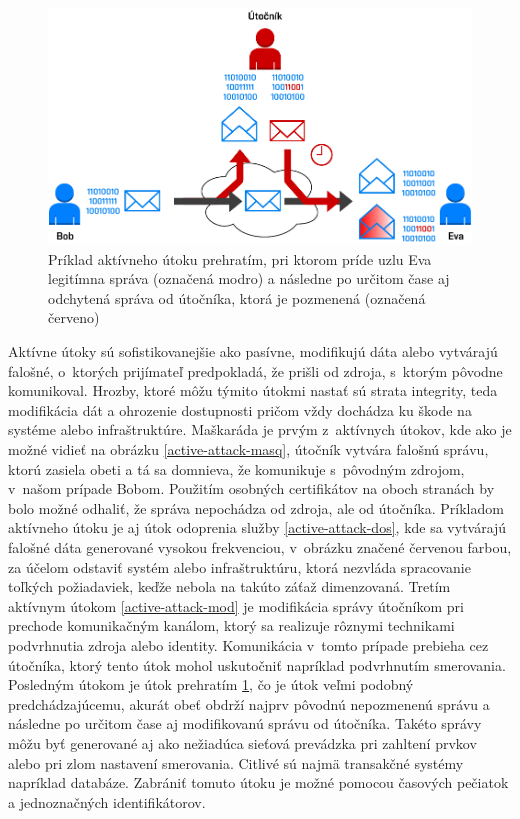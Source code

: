 \begin{figure}[H]
	\begin{center}
		\includegraphics[scale=0.55]{obrazky/active-attack-reply.pdf}
	\end{center}
	\caption[Aktívny útok prehratím]{Príklad aktívneho útoku prehratím, pri ktorom príde uzlu Eva legitímna správa (označená modro) a následne po určitom čase aj odchytená správa od útočníka, ktorá je pozmenená (označená červeno) \cite{Stallings2011}}
	\label{active-attack-reply}
\end{figure}


Aktívne útoky sú sofistikovanejšie ako pasívne, modifikujú dáta alebo vytvárajú falošné, o~ktorých prijímateľ predpokladá, že prišli od zdroja, s~ktorým pôvodne komunikoval. Hrozby, ktoré môžu týmito útokmi nastať sú strata integrity, teda modifikácia dát a ohrozenie dostupnosti pričom vždy dochádza ku škode na systéme alebo infraštruktúre. Maškaráda je prvým z~aktívnych útokov, kde ako je možné vidieť na obrázku \ref{active-attack-masq}, útočník vytvára falošnú správu, ktorú zasiela obeti a tá sa domnieva, že komunikuje s~pôvodným zdrojom, v~našom prípade Bobom. Použitím osobných certifikátov na oboch stranách by bolo možné odhaliť, že správa nepochádza od zdroja, ale od útočníka. Príkladom aktívneho útoku je aj útok odoprenia služby \ref{active-attack-dos}, kde sa vytvárajú falošné dáta generované vysokou frekvenciou, v~obrázku značené červenou farbou, za účelom odstaviť systém alebo infraštruktúru, ktorá nezvláda spracovanie toľkých požiadaviek, keďže nebola na takúto záťaž dimenzovaná. Tretím aktívnym útokom \ref{active-attack-mod} je modifikácia správy útočníkom pri prechode komunikačným kanálom, ktorý sa realizuje rôznymi technikami podvrhnutia zdroja alebo identity. Komunikácia v~tomto prípade prebieha cez útočníka, ktorý tento útok mohol uskutočniť napríklad podvrhnutím smerovania. Posledným útokom je útok prehratím \ref{active-attack-reply}, čo je útok veľmi podobný predchádzajúcemu, akurát obeť obdrží najprv pôvodnú nepozmenenú správu a následne po určitom čase aj modifikovanú správu od útočníka. Takéto správy môžu byť generované aj ako nežiadúca sieťová prevádzka pri zahltení prvkov alebo pri zlom nastavení smerovania. Citlivé sú najmä transakčné systémy napríklad databáze. Zabrániť tomuto útoku je možné pomocou časových pečiatok a jednoznačných identifikátorov. 




